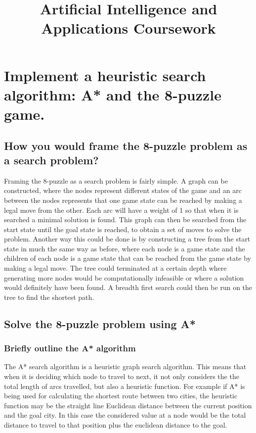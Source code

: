 \documentclass[11pt,a4paper,twoside]{article}
\title{Artificial Intelligence and Applications Coursework}
\author{}
\date{}
\begin{document}
  
  \maketitle
  \tableofcontents
  
    \section{Implement a heuristic search algorithm: A* and the 8-puzzle game.}
    \subsection{How you would frame the 8-puzzle problem as a search problem?}
    Framing the 8-puzzle as a search problem is fairly simple. A graph can be constructed, where the 
    nodes represent different states of the game and an arc between the nodes represents that one 
    game state can be reached by making a legal move from the other. Each arc will have a weight of 
    1 so that when it is searched a minimal solution is found. This graph can then be searched from 
    the start state until the goal state is reached, to obtain a set of moves to solve the problem. 
    Another way this could be done is by constructing a tree from the start state in much the same 
    way as before, where each node is a game state and the children of each node is a game state that 
    can be reached from the game state by making a legal move. The tree could terminated at a 
    certain depth where generating more nodes would be computationally infeasible or where a 
    solution would definitely have been found. A breadth first search could then be run on the tree to 
    find the shortest path. 
    
    \subsection{Solve the 8-puzzle problem using A*}
    \subsubsection{Briefly outline the A* algorithm}
    The A* search algorithm is a heuristic graph search algorithm. This means that when it is 
    deciding which node to travel to next, it not only considers the the total length of arcs travelled, 
    but also a heuristic function. For example if A* is being used for calculating the shortest route 
    between two cities, the heuristic function may be the straight line Euclidean distance between 
    the current position and the goal city. In this case the considered value at a node would be the 
    total distance to travel to that position plus the euclidean distance to the goal. 
    
\end{document}
